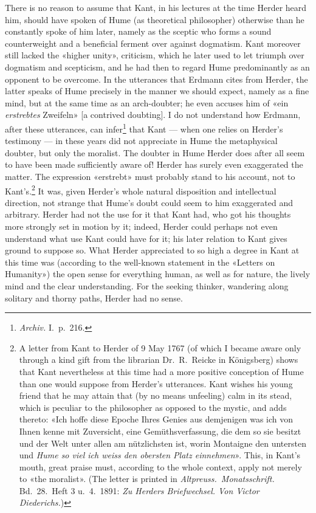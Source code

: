 \documentclass[12pt,a4paper]{article}
\newcommand{\opage}[1]{\marginnote{\footnotesize\textit{[#1]}}}
\begin{document}
There is no reason to assume that Kant, in his lectures at the time Herder
heard him, should have spoken of Hume (as theoretical philosopher)
otherwise than he constantly spoke of him later, namely as the sceptic who
forms a sound counterweight and a beneficial ferment over against
dogmatism. Kant moreover still lacked the «higher unity», criticism, which
he later used to let triumph over dogmatism and scepticism, and he had
then to regard Hume predominantly as an opponent to be overcome. In the
utterances that Erdmann cites from Herder, the latter speaks of Hume
precisely in the manner we should expect, namely as a fine mind, but at
the same time as an arch-doubter; he even accuses him of «ein \emph{erstrebtes}
Zweifeln» [a contrived doubting]. I do not understand how Erdmann, after
these utterances, can infer\footnote{\textit{Archiv.} I.\ p.\ 216.} that
Kant --- when one relies on \opage{25}Herder's testimony --- in these years did not
appreciate in Hume the metaphysical doubter, but only the moralist. The
doubter in Hume Herder does after all seem to have been made sufficiently
aware of! Herder has surely even exaggerated the matter. The expression
«erstrebt» must probably stand to his account, not to Kant's.\footnote{A
letter from Kant to Herder of 9 May 1767 (of which I became aware only
through a kind gift from the librarian Dr.\ R.\ Reicke in Königsberg)
shows that Kant nevertheless at this time had a more positive conception
of Hume than one would suppose from Herder's utterances. Kant wishes his
young friend that he may attain that (by no means unfeeling) calm in its
stead, which is peculiar to the philosopher as opposed to the mystic, and
adds thereto: «Ich hoffe diese Epoche Ihres Genies aus demjenigen was ich
von Ihnen kenne mit Zuversicht, eine Gemüthsverfassung, die dem so sie
besitzt und der Welt unter allen am nützlichsten ist, worin Montaigne den
untersten und \emph{Hume so viel ich weiss den obersten Platz einnehmen}». This,
in Kant's mouth, great praise must, according to the whole context, apply
not merely to «the moralist». (The letter is printed in
\textit{Altpreuss.\ Monatsschrift.} Bd.\ 28.\ Heft 3 u.\ 4.\ 1891:
\textit{Zu Herders Briefwechsel. Von Victor Diederichs.})} It was, given
Herder's whole natural disposition and intellectual direction, not strange
that Hume's doubt could seem to him exaggerated and arbitrary. Herder had
not the use for it that Kant had, who got his thoughts more strongly set
in motion by it; indeed, Herder could perhaps not even understand what use
Kant could have for it; his later relation to Kant gives ground to suppose
so. What Herder appreciated to so high a degree in Kant at this time was
(according to the well-known statement in the «Letters on Humanity») the
open sense for everything human, as well as for nature, the lively mind
and the clear understanding. For the seeking thinker, wandering along
solitary and thorny paths, Herder had no sense.
\end{document}
